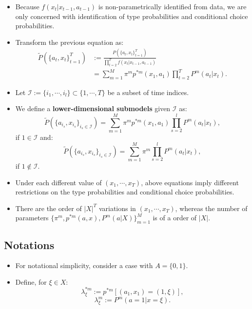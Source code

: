 \documentclass[
]{book}
\providecommand{\tightlist}{%
  \setlength{\itemsep}{0pt}\setlength{\parskip}{0pt}}
\begin{document}
\begin{itemize}
\tightlist
\item
  Because \(f(x_t|x_{t - 1}, a_{t - 1})\) is non-parametrically identified from data, we are only concerned with identification of type probabilities and conditional choice probabilities.
\item
  Transform the previous equation as:
  \[
  \begin{split}
  \widetilde{P}(\{a_t, x_t\}_{t = 1}^T) &:= \frac{P(\{a_t, x_t\}_{t = 1}^T)}{\prod_{t = 2}^T f(x_t|x_{t - 1}, a_{t - 1})}\\
  &= \sum_{m = 1}^M \pi^m p^{*m}(x_1, a_1) \prod_{t = 2}^T P^m(a_t| x_t).
  \end{split}
  \]
\item
  Let \(\mathcal{I} := \{i_1, \cdots, i_l\} \subset \{1, \cdots, T\}\) be a subset of time indices.
\item
  We define a \textbf{lower-dimensional submodels} given \(\mathcal{I}\) as:
  \[
  \widetilde{P}(\{a_{i_s}, x_{i_s}\}_{i_s \in \mathcal{I}}) = \sum_{m = 1}^M \pi^m p^{*m}(x_1, a_1) \prod_{s = 2}^l P^m(a_t| x_t),
  \]
  if \(1 \in \mathcal{I}\) and:
  \[
  \widetilde{P}(\{a_{i_s}, x_{i_s}\}_{i_s \in \mathcal{I}}) = \sum_{m = 1}^M\pi^m \prod_{s = 2}^l P^m(a_t| x_t),
  \]
  if \(1 \not\in \mathcal{I}\).
\item
  Under each different value of \((x_1, \cdots, x_T)\), above equations imply different restrictions on the type probabilities and conditional choice probabilities.
\item
  There are the order of \(|X|^T\) variations in \((x_1, \cdots, x_T)\), whereas the number of parameters \(\{\pi^m, p^{*m}(a, x), P^m(a|X)\}_{m = 1}^M\) is of a order of \(|X|\).
\end{itemize}

\hypertarget{notations}{%
\subsection{Notations}\label{notations}}

\begin{itemize}
\tightlist
\item
  For notational simplicity, consider a case with \(A = \{0, 1\}\).
\item
  Define, for \(\xi \in X\):
  \[
  \lambda_\xi^{*m} := p^{*m}[(a_1, x_1) = (1, \xi)],
  \]
  \[
  \lambda_\xi^m := P^m(a = 1|x = \xi).
  \]
\end{itemize}
\end{document}

